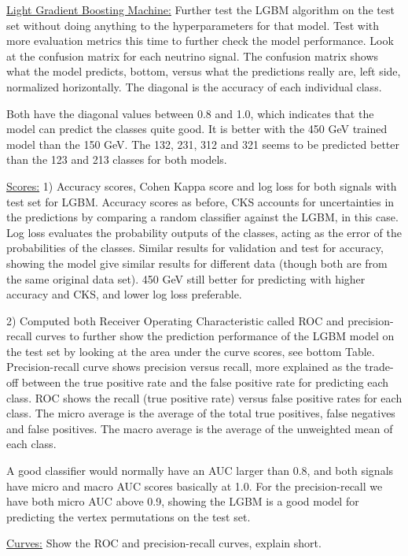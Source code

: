 \documentclass[a4paper, american, 12pt]{report}
\begin{document}
	
	\underline{Light Gradient Boosting Machine:}
	Further test the LGBM algorithm on the test set without doing anything to the hyperparameters for that model. Test with more evaluation metrics this time to further check the model performance. Look at the confusion matrix for each neutrino signal. The confusion matrix shows what the model predicts, bottom, versus what the predictions really are, left side, normalized horizontally. The diagonal is the accuracy of each individual class.
	 
	Both have the diagonal values between 0.8 and 1.0, which indicates that the model can predict the classes quite good. It is better with the 450 GeV trained model than the 150 GeV. The 132, 231, 312 and 321 seems to be predicted better than the 123 and 213 classes for both models.
	
	
	\underline{Scores:}
	1) Accuracy scores, Cohen Kappa score and log loss for both signals with test set for LGBM. Accuracy scores as before, CKS accounts for uncertainties in the predictions by comparing a random classifier against the LGBM, in this case. Log loss evaluates the probability outputs of the classes, acting as the error of the probabilities of the classes.
	Similar results for validation and test for accuracy, showing the model give similar results for different data (though both are from the same original data set). 450 GeV still better for predicting with higher accuracy and CKS, and lower log loss preferable.
	
	2) Computed both Receiver Operating Characteristic called ROC and precision-recall curves to further show the prediction performance of the LGBM model on the test set by looking at the area under the curve scores, see bottom Table. Precision-recall curve shows precision versus recall, more explained as the trade-off between the true positive rate and the false positive rate for predicting each class. ROC shows the recall (true positive rate) versus false positive rates for each class. The micro average is the average of the total true positives, false negatives and false positives. The macro average is the average of the unweighted mean of each class.
	
	A good classifier would normally have an AUC larger than 0.8, and both signals have micro and macro AUC scores basically at 1.0. For the precision-recall we have both micro AUC above 0.9, showing the LGBM is a good model for predicting the vertex permutations on the test set.
	
	
	\underline{Curves:}
	Show the ROC and precision-recall curves, explain short.
	
\end{document}
